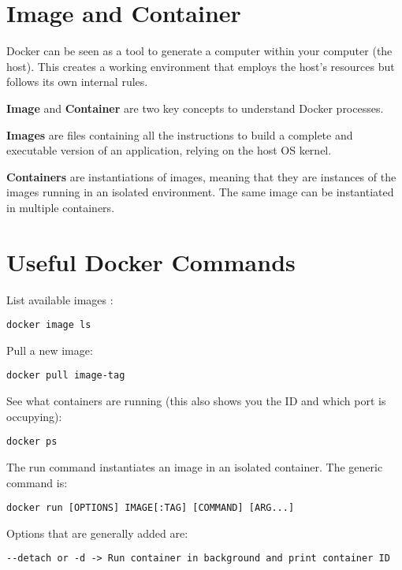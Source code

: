 \documentclass[
]{book}
\begin{document}
\hypertarget{image-and-container}{%
\section{Image and Container}\label{image-and-container}}

Docker can be seen as a tool to generate a computer within your computer (the host). This creates a working environment that employs the host's resources but follows its own internal rules.

\textbf{Image} and \textbf{Container} are two key concepts to understand Docker processes.

\textbf{Images} are files containing all the instructions to build a complete and executable version of an application, relying on the host OS kernel.

\textbf{Containers} are instantiations of images, meaning that they are instances of the images running in an isolated environment. The same image can be instantiated in multiple containers.

\hypertarget{useful-docker-commands}{%
\section{Useful Docker Commands}\label{useful-docker-commands}}

List available images :

\begin{verbatim}
docker image ls
\end{verbatim}

Pull a new image:

\begin{verbatim}
docker pull image-tag
\end{verbatim}

See what containers are running (this also shows you the ID and which port is occupying):

\begin{verbatim}
docker ps
\end{verbatim}

The run command instantiates an image in an isolated container. The generic command is:

\begin{verbatim}
docker run [OPTIONS] IMAGE[:TAG] [COMMAND] [ARG...]
\end{verbatim}

Options that are generally added are:

\begin{verbatim}
--detach or -d -> Run container in background and print container ID
\end{verbatim}
\end{document}
